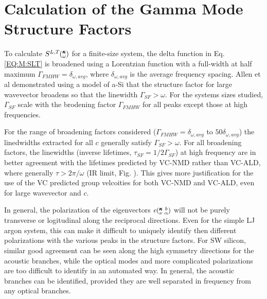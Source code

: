\documentclass[aps,prb,twocolumn,superscriptaddress,amsmath,amssymb,floatfix]{revtex4}
\newcommand{\kvba}{\mspace{-4.0mu}\left(\mspace{-8.0mu}
\begin{smallmatrix} &\pmb{\kappa} &b \\ &\nu &\alpha\end{smallmatrix}
\mspace{-3.0mu}\right)}
\newcommand{\kw}{\mspace{-4.0mu}\left(\mspace{-8.0mu}
\begin{smallmatrix}&\pmb{\kappa} \\&\omega\end{smallmatrix}
\mspace{-3.0mu}\right)}
\begin{document}
\section{\label{A:SF}Calculation of the Gamma Mode Structure Factors}

To calculate 
$S^{L,T}\kw$ for a finite-size system, the 
delta function in Eq. \eqref{EQ:M:SLT} is broadened using a Lorentzian 
function with a full-width at half maximum 
$\Gamma_{FMHW} = \delta_{\omega,avg}$, 
where 
$\delta_{\omega,avg}$ is the average frequency spacing. 
Allen et al\cite{allen_diffusons_1999} 
demonstrated using a model of 
a-Si that the structure factor 
for large wavevector broadens so that the 
linewidth $\Gamma_{SF} > \omega$.
\cite{taraskin_determination_1999}
For the systems sizes studied, $\Gamma_{SF}$ 
scale with the brodening factor 
$\Gamma_{FMHW}$ for all peaks 
except those at high frequencies. 

For the range of broadening factors 
considered ($\Gamma_{FMHW} = \delta_{\omega,avg}$ to $50\delta_{\omega,avg}$) 
the linedwidths extracted for all $c$ 
generally satisfy $\Gamma_{SF} > \omega$. 
For all broadening factors, the linewidths 
(inverse lifetimes, $\tau_{SF} = 1/2\Gamma_{SF}$) 
at high frequency are in better 
agreement with the lifetimes predicted 
by VC-NMD rather than VC-ALD,
where generally $\tau > 2\pi/\omega$ (IR limit, Fig. ).
\cite{taraskin_determination_1999} This gives more  
justification for the use of the VC predicted group velcoities for 
both VC-NMD and VC-ALD, even for large wavevector and $c$. 

In general, the polarization of the eigenvectors $e\kvba$ will not 
be purely transverse or logitudinal along the reciprocal directions. 
Even for the simple LJ argon system, this can make it difficult to 
uniquely identify then different polarizations with the various 
peaks in the structure factors. For SW silicon, similar good agreement 
can be seen along the high symmetry directions for the acoustic branches, 
while the optical modes 
and more complicated polarizations are too difficult to identify in 
an automated way. 
In general, the acoustic branches can be identified, provided they are 
well separated in frequency from any optical branches.
\cite{feldman_numerical_1999,thomas_predicting_2010} 

\end{document}
